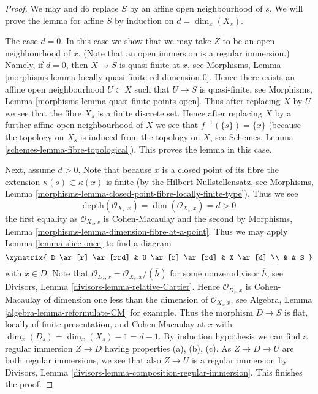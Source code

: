 \begin{proof}
We may and do replace $S$ by an affine open neighbourhood of $s$.
We will prove the lemma for affine $S$ by induction on $d = \dim_x(X_s)$.

\medskip\noindent
The case $d = 0$. In this case we show that we may take $Z$ to be
an open neighbourhood of $x$. (Note that an open immersion is
a regular immersion.) Namely, if $d = 0$, then $X \to S$
is quasi-finite at $x$, see
Morphisms, Lemma \ref{morphisms-lemma-locally-quasi-finite-rel-dimension-0}.
Hence there exists an affine open neighbourhood $U \subset X$ such
that $U \to S$ is quasi-finite, see
Morphisms, Lemma \ref{morphisms-lemma-quasi-finite-points-open}.
Thus after replacing $X$ by $U$ we see that the fibre $X_s$ is a finite
discrete set. Hence after replacing $X$ by a further affine open neighbourhood
of $X$ we see that $f^{-1}(\{s\}) = \{x\}$ (because the topology
on $X_s$ is induced from the topology on $X$, see
Schemes, Lemma \ref{schemes-lemma-fibre-topological}).
This proves the lemma in this case.

\medskip\noindent
Next, assume $d > 0$. Note that because $x$ is a closed point of its
fibre the extension $\kappa(s) \subset \kappa(x)$ is finite (by the
Hilbert Nullstellensatz, see
Morphisms, Lemma \ref{morphisms-lemma-closed-point-fibre-locally-finite-type}).
Thus we see
$$
\text{depth}(\mathcal{O}_{X_s, x}) = \dim(\mathcal{O}_{X_s, x}) = d > 0
$$
the first equality as $\mathcal{O}_{X_s, x}$ is Cohen-Macaulay and
the second by
Morphisms, Lemma \ref{morphisms-lemma-dimension-fibre-at-a-point}.
Thus we may apply
Lemma \ref{lemma-slice-once}
to find a diagram
$$
\xymatrix{
D \ar[r] \ar[rrd] & U \ar[r] \ar[rd] & X \ar[d] \\
& & S
}
$$
with $x \in D$. Note that
$\mathcal{O}_{D_s, x} = \mathcal{O}_{X_s, x}/(\overline{h})$ for some
nonzerodivisor $\overline{h}$, see
Divisors, Lemma \ref{divisors-lemma-relative-Cartier}.
Hence $\mathcal{O}_{D_s, x}$ is Cohen-Macaulay of dimension
one less than the dimension of $\mathcal{O}_{X_s, x}$, see
Algebra, Lemma \ref{algebra-lemma-reformulate-CM}
for example. Thus the morphism $D \to S$ is flat,
locally of finite presentation, and Cohen-Macaulay at $x$ with
$\dim_x(D_s) = \dim_x(X_s) - 1 = d - 1$. By induction hypothesis
we can find a regular immersion $Z \to D$ having properties (a), (b), (c).
As $Z \to D \to U$ are both regular immersions, we see that also
$Z \to U$ is a regular immersion by
Divisors, Lemma \ref{divisors-lemma-composition-regular-immersion}.
This finishes the proof.
\end{proof}

